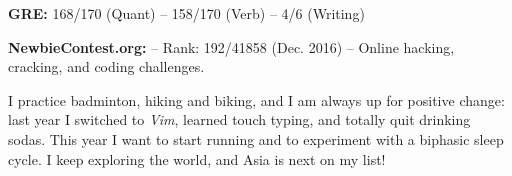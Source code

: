 \documentclass[a4paper, 12pt]{article}
\newcommand{\marginmisc}{0.15cm}
\begin{document}
\begin{footnotesize}
\vspace{\marginmisc}
\textbf{GRE:} 168/170 (Quant) -- 158/170 (Verb) -- 4/6 (Writing)

\vspace{\marginmisc}
\textbf{NewbieContest.org:} -- Rank: 192/41858 (Dec. 2016) -- Online hacking, cracking, and coding challenges.

\vspace{\marginmisc}
I practice badminton, hiking and biking, and I am always up for positive change: last year I switched to \textit{Vim}, learned touch typing, and totally quit drinking sodas. This year I want to start running and to experiment with a biphasic sleep cycle. I keep exploring the world, and Asia is next on my list! 
  
\end{footnotesize}
\end{document}

